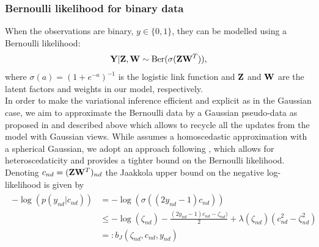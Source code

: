 \subsubsection*{Bernoulli likelihood for binary data}
When the observations are binary, $y \in \{0,1\}$, they can be modelled using a Bernoulli likelihood:
\begin{equation*}
{\bf Y}|{\bf Z},{\bf W} \sim \text{Ber}(\sigma({\bf Z}{\bf W}^T)),
\end{equation*} where $\sigma(a)=(1+e^{-a})^{-1}$ is the logistic link function and ${\bf Z}$ and ${\bf W}$ are the latent factors and weights in our model, respectively.\\
In order to make the variational  inference efficient and explicit as in the Gaussian case, we aim to approximate the Bernoulli data by a Gaussian pseudo-data as proposed in \cite{Seeger2012} and described above which allows to recycle all the updates from the model with Gaussian views. While \cite{Seeger2012} assumes a homoscedastic approximation with a spherical Gaussian, we adopt an approach following \cite{Jaakkola2000}, which allows for heteroscedaticity and provides a tighter bound on the Bernoulli likelihood.\\
Denoting $c_{nd}=({\bf Z}{\bf W}^T)_{nd}$ the Jaakkola upper bound \cite{Jaakkola2000} on the negative log-likelihood is given by
\begin{align*}
\begin{split}
-\log\left(p(y_{nd}|c_{nd})\right) &= -\log\left(\sigma\left((2y_{nd}-1)  c_{nd}\right)\right)\\
& \leq -\log(\zeta_{nd})-\frac{(2y_{nd}-1)c_{nd}-\zeta_{nd})}{2} +\lambda(\zeta_{nd})\left(c_{nd}^2 -\zeta_{nd}^2 \right)\\
& =: b_J(\zeta_{nd}, c_{nd},y_{nd} )
\label{jaakkola}
\end{split}
\end{align*}
